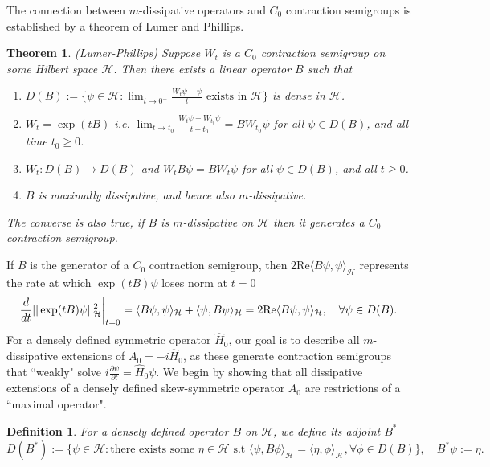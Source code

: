 \documentclass{article}
\numberwithin{equation}{section}
\newtheorem{theorem}{Theorem}[section]
\newtheorem{definition}{Definition}[section]
\begin{document}
The connection between $m$-dissipative operators and $C_0$ contraction semigroups is established by a theorem of Lumer and Phillips.
\begin{theorem}\label{Lumer-Phillips}\cite{Phi59}
    (Lumer-Phillips) Suppose $W_t$ is a $C_0$ contraction semigroup on some Hilbert space $\mathcal{H}$. Then there exists a linear operator $B$ such that
    \begin{enumerate}
        \item $D(B):= \{ \psi \in \mathcal{H}:\lim_{t \to 0^+}\frac{W_t \psi - \psi}{t} \text{ exists in }\mathcal{H} \}$ is dense in $\mathcal{H}$.
        \item $W_t=\exp(tB)$ i.e.  $\lim_{t \to t_0}\frac{W_t \psi - W_{t_0}\psi}{t-t_0}= B W_{t_0} \psi$ for all $\psi \in D(B)$, and all time $t_0\geq 0$.
        \item $W_t:D(B)\to D(B)$ and $W_tB\psi=BW_t\psi$ for all $\psi \in D(B)$, and all $t \geq 0$.
        \item $B$ is maximally dissipative, and hence also $m$-dissipative.
    \end{enumerate}
    The converse is also true, if $B$ is $m$-dissipative on $\mathcal{H}$ then it generates a $C_0$ contraction semigroup.
\end{theorem}
If $B$ is the generator of a $C_0$ contraction semigroup, then $2\text{Re}\langle B \psi, \psi \rangle_{\mathcal{H}}$ represents the rate at which $\exp(tB)\psi$ loses norm at $t=0$
\begin{equation}
    \frac{d}{dt} ||\exp(tB)\psi||_\mathcal{H}^2 \bigg{|}_{t=0}=\langle B \psi, \psi\rangle_{\mathcal{H}} + \langle \psi, B \psi \rangle_{\mathcal{H}}=2\text{Re}\langle B \psi, \psi \rangle_{\mathcal{H}}, \quad \forall \psi \in D(B).
\end{equation}
For a densely defined symmetric operator $\hat{H}_0$, our goal is to describe all $m$-dissipative extensions of $A_0=-i\hat{H}_0$, as these generate contraction semigroups that ``weakly" solve $i\frac{\partial \psi}{\partial t}=\hat{H}_0 \psi$. We begin by showing that all dissipative extensions of a densely defined skew-symmetric operator $A_0$ are restrictions of a ``maximal operator".
\begin{definition}
    For a densely defined operator $B$ on $\mathcal{H}$, we define its adjoint $B^*$
    \begin{equation}
        D(B^*):= \{\psi \in \mathcal{H}: \text{there exists some } \eta\in \mathcal{H} \text{ s.t } \langle \psi,B \phi \rangle_\mathcal{H}= \langle \eta,\phi \rangle_\mathcal{H}, \forall \phi \in D(B) \}, \quad B^*\psi:=\eta.
    \end{equation}
\end{definition}
\end{document}

